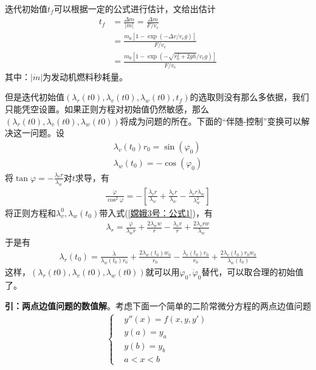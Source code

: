             \par
            迭代初始值$t_f$可以根据一定的公式进行估计，文\cite{Zhao}给出估计
            \begin{align*}
            t_f &= \frac{\Delta m}{|\dot{m}|} = \frac{\Delta m}{F/v_e}\\
            & = \frac{m_0 [1-\exp (-\Delta v/v_eg)]}{F/v_e}\\
            & = \frac{m_0[1-\exp(-\sqrt{r_0^2+2gh}/v_eg)]}{F/v_e}
            \end{align*}
            其中：$|\dot{m}|$为发动机燃料秒耗量。
            \par
            但是迭代初始值$(\lambda_r(t0),\lambda_v(t0),\lambda_w(t0),t_f)$的选取则没有那么多依据，我们只能凭空设置。如果正则方程对初始值仍然敏感，那么$(\lambda_r(t0),\lambda_v(t0),\lambda_w(t0))$将成为问题的所在。下面的“伴随-控制”变换可以解决这一问题。设
            \begin{align*}
            \lambda_v(t_0) r_0 = \sin (\varphi_0)\\
            \lambda_w(t_0) = -\cos(\varphi_0)
            \end{align*}
            将$\tan\varphi =- \frac{\lambda_v r}{\lambda_w}$对$t$求导，有
            \begin{align}
            \label{嫦娥3号：公式1}
            \frac{\dot{\varphi}}{\cos^2\varphi} = - \left[ \frac{\dot{\lambda}_vr}{\lambda_w}+\frac{\lambda_vr}{\lambda_w} - \frac{\lambda_v r\dot{\lambda}_w}{\lambda_w^2} \right]
            \end{align}
            将正则方程和$\lambda_v^0,\lambda_w(t_0)$带入式(\ref{嫦娥3号：公式1})，有
            \begin{align*}
            \lambda_r = \frac{\dot{\varphi}}{\lambda_wr}+\frac{2\lambda_w w}{r}-\frac{\lambda_v v}{r}+\frac{2\lambda_v r w}{\lambda_w}
            \end{align*}
            于是有
            \begin{align*}
            \lambda_r(t_0) = \frac{\dot{\lambda}}{\lambda_w(t_0)r_0} + \frac{2\lambda_w(t_0)w_0}{r_0} - \frac{\lambda_v(t_0)v_0}{r_0}+\frac{2\lambda_v(t_0)r_0w_0}{\lambda_w(t_0)}
            \end{align*}
            这样，$(\lambda_r(t0),\lambda_v(t0),\lambda_w(t0))$就可以用$\varphi_0,\dot{\varphi}_0$替代，可以取合理的初始值了。
            \par
            \textbf{引：两点边值问题的数值解}。考虑下面一个简单的二阶常微分方程的两点边值问题
            \begin{align*}
            \left\{
            \begin{aligned}
            & y''(x) = f(x,y,y')\\
            & y(a) = y_a\\
            & y(b) = y_b\\
            & a<x<b
            \end{aligned}
            \right.
            \end{align*}
